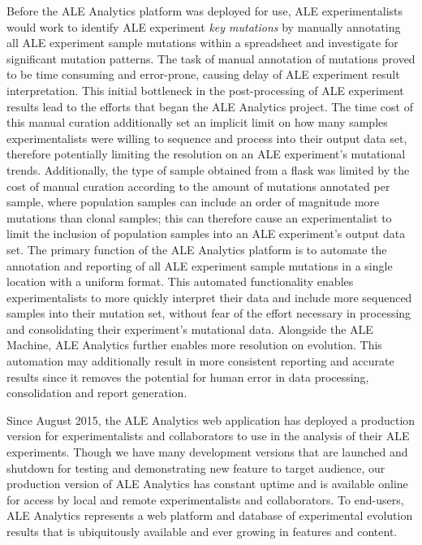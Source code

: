 \documentclass[12pt,final,masters,chapterheads]{ucsd}  %
\begin{document}
%
%
Before the ALE Analytics platform was deployed for use, ALE experimentalists would work to identify ALE experiment \textit{key mutations} by manually annotating all ALE experiment sample mutations within a spreadsheet and investigate for significant mutation patterns. The task of manual annotation of mutations proved to be time consuming and error-prone, causing delay of ALE experiment result interpretation. This initial bottleneck in the post-processing of ALE experiment results lead to the efforts that began the ALE Analytics project. The time cost of this manual curation additionally set an implicit limit on how many samples experimentalists were willing to sequence and process into their output data set, therefore potentially limiting the resolution on an ALE experiment's mutational trends. Additionally, the type of sample obtained from a flask was limited by the cost of manual curation according to the amount of mutations annotated per sample, where population samples can include an order of magnitude more mutations than clonal samples; this can therefore cause an experimentalist to limit the inclusion of population samples into an ALE experiment's output data set. The primary function of the ALE Analytics platform is to automate the annotation and reporting of all ALE experiment sample mutations in a single location with a uniform format. This automated functionality enables experimentalists to more quickly interpret their data and include more sequenced samples into their mutation set, without fear of the effort necessary in processing and consolidating their experiment's mutational data. Alongside the ALE Machine, ALE Analytics further enables more resolution on evolution. This automation may additionally result in more consistent reporting and accurate results since it removes the potential for human error in data processing, consolidation and report generation.

Since August 2015, the ALE Analytics web application has deployed a production version for experimentalists and collaborators to use in the analysis of their ALE experiments. Though we have many development versions that are launched and shutdown for testing and demonstrating new feature to target audience, our production version of ALE Analytics has constant uptime and is available online for access by local and remote experimentalists and collaborators. To end-users, ALE Analytics represents a web platform and database of experimental evolution results that is ubiquitously available and ever growing in features and content.
\end{document}
